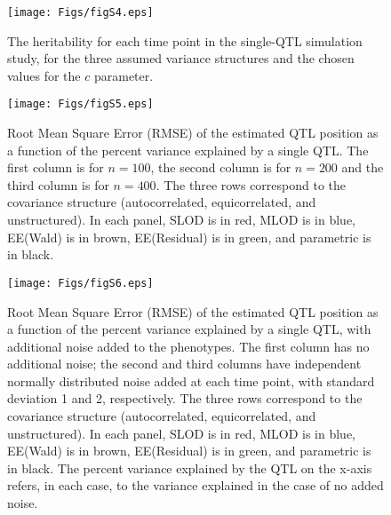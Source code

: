 \documentclass[letterpaper,twoside]{article}
\begin{document}
\clearpage

\begin{figure}[!ht]
\begin{center}
\texttt{[image: Figs/figS4.eps]}
\vspace{1cm}
 \caption{The heritability for each time point in the single-QTL
   simulation study, for the three assumed variance structures and the
   chosen values for the $c$ parameter.}
\end{center}
\end{figure}

\newpage

\begin{figure}[!ht]
\begin{center}
\texttt{[image: Figs/figS5.eps]}
\vspace{1cm}
 \caption{Root Mean Square Error (RMSE) of the estimated
   QTL position as a function of the percent variance explained by a
   single QTL.  The first column is for $n=100$, the second column is for $n=200$ and the third column is
   for $n=400$. The three rows correspond to the covariance structure
   (autocorrelated, equicorrelated, and unstructured).  In each panel,
   SLOD is in red, MLOD is in blue, EE(Wald) is in brown, EE(Residual)
   is in green, and parametric is in black.}
\end{center}
\end{figure}

\newpage

\begin{figure}[!ht]
\begin{center}
\texttt{[image: Figs/figS6.eps]}
\vspace{1cm}
 \caption{Root Mean Square Error (RMSE) of the estimated QTL position
   as a function of the percent variance explained by a single QTL,
   with additional noise added to the phenotypes.  The first column
   has no additional noise; the second and third columns have
   independent normally distributed noise added at each time point,
   with standard deviation 1 and 2, respectively. The three rows
   correspond to the covariance structure (autocorrelated,
   equicorrelated, and unstructured). In each panel, SLOD is in red,
   MLOD is in blue, EE(Wald) is in brown, EE(Residual) is in green,
   and parametric is in black. The percent variance explained by the
   QTL on the x-axis refers, in each case, to the variance explained
   in the case of no added noise.}
\end{center}
\end{figure}
\end{document}
